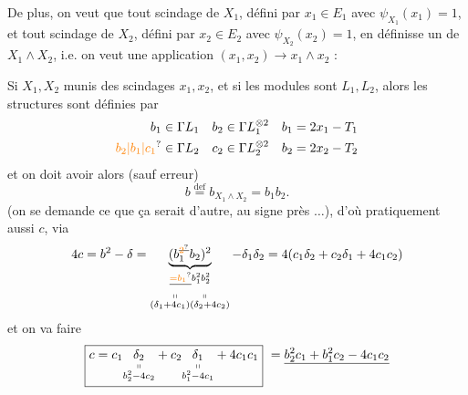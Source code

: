 De plus, on veut que tout scindage de $X_1$,  défini par $x_1\in E_1$ avec $\psi_{X_1}(x_1)=1$, et tout scindage de $X_2$, défini par $x_2\in E_2$ avec $\psi_{X_2}(x_2)=1$, en définisse un de $X_1\wedge X_2$, i.e. on veut une application
$(x_1,x_2)\longrightarrow x_1\wedge x_2$ :

Si $X_1,X_2$ munis des scindages $x_1,x_2$, et si les modules   sont $L_1,L_2$, alors les structures sont définies par
\[
\begin{aligned}b_1&\in\Gamma L_1&b_2&\in\Gamma L_1^{\otimes2}&b_1&=2x_1-T_1\\ \unsure{b_2|b_1|c_1}&\in\Gamma L_2&c_2&\in\Gamma L_2^{\otimes2}&b_2&=2x_2-T_2\end{aligned}
\]
et on doit avoir alors (sauf erreur)
\[
\boxed{b\overset{\mathrm{def}}=b_{X_1\wedge X_2}=b_1b_2}.
\]
(on se demande ce que ça serait d'autre, au signe près $\ldots$), d'où pratiquement aussi $c$, via
\[
4c=b^2-\delta=\underbrace{(b_1^{\deleted{\unsure{2}}}b_2)^2}_{\substack{\deleted{\unsure{=b_1}}b_1^2b_2^2\\\shortparallel\qquad\shortparallel\\(\delta_1+4c_1)(\delta_2+4c_2)}}-\delta_1\delta_2=4(c_1\delta_2+c_2\delta_1+4c_1c_2)
\]
et on va faire
\[
\boxed{c=c_1\underset{\substack{\shortparallel\\b_2^2-4c_2}}{\delta_2}+c_2\underset{\substack{\shortparallel\\b_1^2-4c_1}}{\delta_1}+4c_1c_1}\ =\underline{b_2^2c_1+b_1^2c_2-4c_1c_2}
\]

